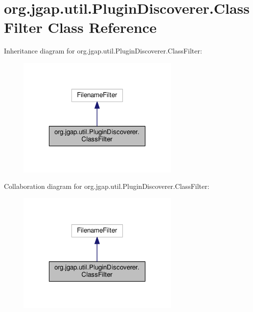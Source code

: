 \hypertarget{classorg_1_1jgap_1_1util_1_1_plugin_discoverer_1_1_class_filter}{\section{org.\-jgap.\-util.\-Plugin\-Discoverer.\-Class\-Filter Class Reference}
\label{classorg_1_1jgap_1_1util_1_1_plugin_discoverer_1_1_class_filter}
}


Inheritance diagram for org.\-jgap.\-util.\-Plugin\-Discoverer.\-Class\-Filter\-:
\nopagebreak
\begin{figure}[H]
\begin{center}
\leavevmode
\includegraphics[width=226pt]{classorg_1_1jgap_1_1util_1_1_plugin_discoverer_1_1_class_filter__inherit__graph}
\end{center}
\end{figure}


Collaboration diagram for org.\-jgap.\-util.\-Plugin\-Discoverer.\-Class\-Filter\-:
\nopagebreak
\begin{figure}[H]
\begin{center}
\leavevmode
\includegraphics[width=226pt]{classorg_1_1jgap_1_1util_1_1_plugin_discoverer_1_1_class_filter__coll__graph}
\end{center}
\end{figure}

